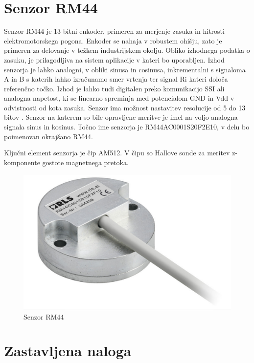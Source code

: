 \chapter{Senzor RM44}

Senzor RM44 je 13 bitni enkoder, primeren za merjenje zasuka in hitrosti elektromotorskega pogona\cite{RM44}.
Enkoder se nahaja v robustem ohišju, zato je primeren za delovanje v težkem industrijskem okolju. %
Obliko izhodnega podatka o zasuku, je prilagodljiva na sistem aplikacije v kateri bo uporabljen\cite{Ambrozic}. Izhod senzorja je lahko analogni, v obliki sinusa in cosinusa, inkrementalni \cite{inkrementalni} s signaloma A in B s katerih lahko izračunamo smer vrtenja ter signal Ri kateri določa referenčno točko. Izhod je lahko tudi digitalen preko komunikacijo SSI ali analogna napetost, ki se linearno spreminja med potencialom GND in Vdd v odvistnosti od kota zasuka. Senzor ima možnost nastavitev resolucije od 5 do 13 bitov \cite{RM44}\cite{AM8192}. Senzor na katerem so bile opravljene meritve je imel na voljo analogna signala sinus in kosinus. Točno ime senzorja je RM44AC0001S20F2E10, v delu bo poimenovan okrajšano RM44.

Ključni element senzorja je čip AM512. V čipu so Hallove sonde za meritev z-komponente gostote magnetnega pretoka. 

\begin{figure}[h]
	\centering
	\includegraphics[width=0.8\columnwidth]{./Slike/senzorRM44.jpg}
	\caption{Senzor RM44}
	\label{RM44}
\end{figure}



\chapter{Zastavljena naloga}

